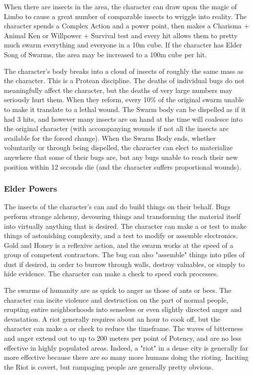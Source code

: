  When there are insects in the area, the character can draw upon the magic of Limbo to cause a great number of comparable insects to wriggle into reality. The character spends a Complex Action and a power point, then makes a Charisma + Animal Ken or Willpower + Survival test and every hit allows them to pretty much swarm everything and everyone in a 10m cube. If the character has Elder Song of Swarms, the area may be increased to a 100m cube per hit.

 The character's body breaks into a cloud of insects of roughly the same mass as the character. This is a Protean discipline. The deaths of individual bugs do not meaningfully affect the character, but the deaths of very large numbers may seriously hurt them. When they reform, every 10\% of the original swarm unable to make it translate to a lethal wound. The Swarm body can be dispelled as if it had 3 hits, and however many insects are on hand at the time will coalesce into the original character (with accompanying wounds if not all the insects are available for the forced change). When the Swarm Body ends, whether voluntarily or through being dispelled, the character can elect to materialize anywhere that some of their bugs are, but any bugs unable to reach their new position within 12 seconds die (and the character suffers proportional wounds).

\subsubsection{Elder Powers}

 The insects of the character's can and do build things on their behalf. Bugs perform strange alchemy, devouring things and transforming the material itself into virtually anything that is desired. The character can make a  or  test to make things of astonishing complexity, and a  test to modify or assemble electronics. Gold and Honey is a reflexive action, and the swarm works at the speed of a group of competent contractors. The bug can also "assemble" things into piles of dust if desired, in order to burrow through walls, destroy valuables, or simply to hide evidence. The character can make a  check to speed such processes.

 The swarms of humanity are as quick to anger as those of ants or bees. The character can incite violence and destruction on the part of normal people, erupting entire neighborhoods into senseless or even slightly directed anger and devastation. A riot generally requires about an hour to cook off, but the character can make a  or  check to reduce the timeframe. The waves of bitterness and anger extend out to up to 200 meters per point of Potency, and are no less effective in highly populated areas. Indeed, a "riot" in a dense city is generally far more effective because there are so many more humans doing the rioting. Inciting the Riot is covert, but rampaging people are generally pretty obvious.

